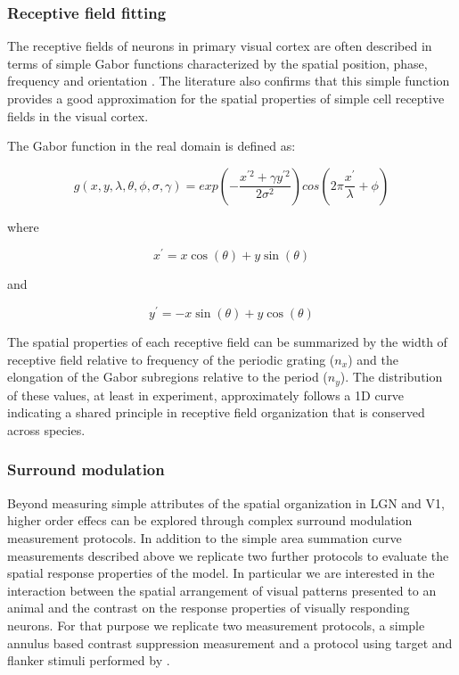 \subsubsection{Receptive field fitting}

The receptive fields of neurons in primary visual cortex are often
described in terms of simple Gabor functions characterized by the
spatial position, phase, frequency and orientation
\citep{Jones1987,Ringach2004}. The literature also confirms that this
simple function provides a good approximation for the spatial
properties of simple cell receptive fields in the visual cortex.

The Gabor function in the real domain is defined as:

\begin{equation}
  g(x, y, \lambda, \theta, \phi, \sigma, \gamma) = exp(-\frac{x^{\prime 2} + \gamma y^{\prime 2}}{2\sigma^2}) cos(2 \pi \frac{x^\prime}{\lambda}+\phi)
\end{equation}

where

\begin{equation}
  x^\prime = x\cos(\theta) + y\sin(\theta)
\end{equation}

and

\begin{equation}
y^\prime = -x\sin(\theta) + y\cos(\theta)
\end{equation}

The spatial properties of each receptive field can be summarized by
the width of receptive field relative to frequency of the periodic
grating ($n_x$) and the elongation of the Gabor subregions relative to
the period ($n_y$). The distribution of these values, at least in
experiment, approximately follows a 1D curve indicating a shared
principle in receptive field organization that is conserved across
species.

\subsubsection{Surround modulation}

Beyond measuring simple attributes of the spatial organization in LGN
and V1, higher order effecs can be explored through complex surround
modulation measurement protocols. In addition to the simple area
summation curve measurements described above we replicate two further
protocols to evaluate the spatial response properties of the model.
In particular we are interested in the interaction between the spatial
arrangement of visual patterns presented to an animal and the contrast
on the response properties of visually responding neurons. For that
purpose we replicate two measurement protocols, a simple annulus based
contrast suppression measurement \cite{Jones2002} and a protocol using
target and flanker stimuli performed by \cite{Kapadia1995}.

